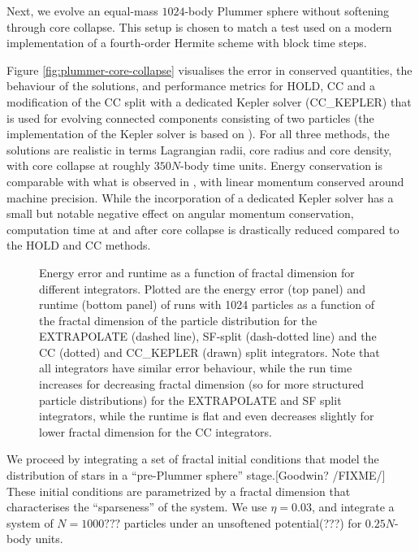 \documentclass[referee]{aa}
\begin{document}
Next, we evolve an equal-mass $1024$-body Plummer sphere without
softening through core collapse. This setup is chosen to match a test
used on a modern implementation of a fourth-order Hermite scheme with
block time steps.\cite[their section 3.4.1]{Konstantinidis:2010hx}

Figure \ref{fig:plummer-core-collapse} visualises the error in conserved
quantities, the behaviour of the solutions, and performance metrics
for HOLD, CC and a modification of the CC split with a dedicated Kepler
solver (CC\_KEPLER) that is used for evolving connected components
consisting of two particles (the implementation of the Kepler solver
is based on \cite{bate1971fundamentals}). For all three methods,
the solutions are realistic in terms Lagrangian radii, core radius
and core density, with core collapse at roughly $350$$N$-body time
units. Energy conservation is comparable with what is observed in
\cite{Konstantinidis:2010hx}, with linear momentum conserved around
machine precision. While the incorporation of a dedicated Kepler solver
has a small but notable negative effect on angular momentum conservation,
computation time at and after core collapse is drastically reduced
compared to the HOLD and CC methods. 

\begin{figure}[p]
\begin{centering}
\par\end{centering}

\caption{\label{fig:fractal-initial-conditions}Energy error and runtime as
a function of fractal dimension for different integrators. Plotted
are the energy error (top panel) and runtime (bottom panel) of runs
with 1024 particles as a function of the fractal dimension of the
particle distribution for the EXTRAPOLATE (dashed line), SF-split
(dash-dotted line) and the CC (dotted) and CC\_KEPLER (drawn) split
integrators. Note that all integrators have similar error behaviour,
while the run time increases for decreasing fractal dimension (so
for more structured particle distributions) for the EXTRAPOLATE and
SF split integrators, while the runtime is flat and even decreases
slightly for lower fractal dimension for the CC integrators. }
\end{figure}


We proceed by integrating a set of fractal initial conditions that
model the distribution of stars in a ``pre-Plummer sphere'' stage.{[}Goodwin?
/FIXME/{]} These initial conditions are parametrized by a fractal
dimension that characterises the ``sparseness'' of the system. We
use $\eta=0.03$, and integrate a system of $N=1000???$ particles
under an unsoftened potential(???) for $0.25$$N$-body units. 
\end{document}

